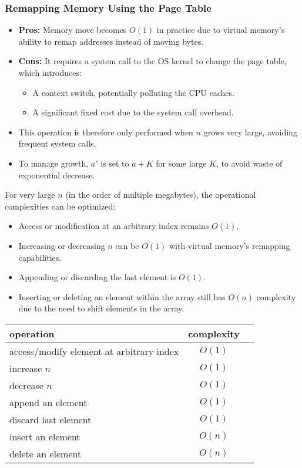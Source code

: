 \documentclass[12pt]{article}
\begin{document}
\subsubsection{Remapping Memory Using the Page Table}
\begin{itemize}
    \item \textbf{Pros:} Memory move becomes \( O(1) \) in practice due to virtual memory's ability to remap addresses instead of moving bytes.
    \item \textbf{Cons:} It requires a system call to the OS kernel to change the page table, which introduces:
    \begin{itemize}
        \item A context switch, potentially polluting the CPU caches.
        \item A significant fixed cost due to the system call overhead.
    \end{itemize}
    \item This operation is therefore only performed when \( n \) grows very large, avoiding frequent system calls.
    \item To manage growth, \( a' \) is set to \( a + K \) for some large \( K \), to avoid waste of exponential decrease.
\end{itemize}

For very large \( n \) (in the order of multiple megabytes), the operational complexities can be optimized:
\begin{itemize}
    \item Access or modification at an arbitrary index remains \( O(1) \).
    \item Increasing or decreasing \( n \) can be \( O(1) \) with virtual memory's remapping capabilities.
    \item Appending or discarding the last element is \( O(1) \).
    \item Inserting or deleting an element within the array still has \( O(n) \) complexity due to the need to shift elements in the array.
\end{itemize}

\begin{center}
    \begin{tabular}{ l c c }
    \hline
    \textbf{operation} & \textbf{complexity} \\
    \hline
    access/modify element at arbitrary index & \( O(1) \) \\
    increase \( n \) & \( O(1) \) \\
    decrease \( n \) & \( O(1) \) \\
    append an element & \( O(1) \) \\
    discard last element & \( O(1) \) \\
    insert an element & \( O(n) \) \\
    delete an element & \( O(n) \) \\
    \hline
    \end{tabular}
\end{center}
\end{document}
